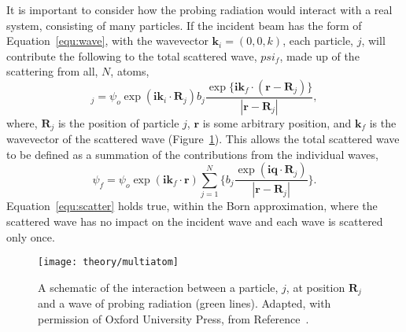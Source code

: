It is important to consider how the probing radiation would interact with a real system, consisting of many particles.
If the incident beam has the form of Equation~\ref{equ:wave}, with the wavevector $\mathbf{k}_i = (0, 0, k)$, each particle, $j$, will contribute the following to the total scattered wave, $psi_f$, made up of the scattering from all, $N$, atoms,
%
\begin{equation}
    [\delta\psi_f]_j = \psi_o\exp{(\mathbf{ik}_i\cdot \mathbf{R}_j)}b_j\frac{\exp{\big\{\mathbf{ik}_f\cdot (\mathbf{r}-\mathbf{R}_j)\big\}}}{|\mathbf{r}-\mathbf{R}_j|},
\end{equation}
%
where, $\mathbf{R}_j$ is the position of particle $j$, $\mathbf{r}$ is some arbitrary position, and $\mathbf{k}_f$ is the wavevector of the scattered wave (Figure~\ref{fig:multiatom}).
This allows the total scattered wave to be defined as a summation of the contributions from the individual waves,
%
\begin{equation}
    \psi_f = \psi_o \exp{(\mathbf{ik}_f\cdot\mathbf{r})}\sum_{j=1}^{N}\bigg\{b_j \frac{\exp{(\mathbf{iq}\cdot \mathbf{R}_j)}}{|\mathbf{r}-\mathbf{R}_j|}\bigg\}.
    \label{equ:scatter}
\end{equation}
%
Equation~\ref{equ:scatter} holds true, within the Born approximation, where the scattered wave has no impact on the incident wave and each wave is scattered only once.
%
\begin{figure}
    \centering
    \texttt{[image: theory/multiatom]}
    \caption{A schematic of the interaction between a particle, $j$, at position $\mathbf{R}_j$ and a wave of probing radiation (green lines). Adapted, with permission of Oxford University Press\textsuperscript{\textcopyright}, from Reference~\cite{sivia_elementary_2011}.}
    \label{fig:multiatom}
\end{figure}
%

